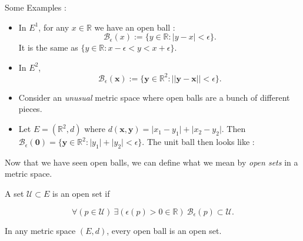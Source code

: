 Some Examples : 
\begin{itemize}
    \item In $E^1$, for any $x \in \mathbb{R}$ we have an open ball :
	\begin{displaymath}
	    \mathcal{B}_{\epsilon}(x) := \left.\lbrace y \in \mathbb{R}  : \lvert y - x \rvert 
		< \epsilon \rbrace\right. .
	\end{displaymath}
	It is the same as $\left.\lbrace y \in \mathbb{R} : x -\epsilon < y < x + \epsilon 
	    \rbrace\right.$. 
    \item In $E^2$,	
	\begin{displaymath}
	    \mathcal{B}_{\epsilon}(\mathbf{x}) := \left.\lbrace \mathbf{y} \in \mathbb{R}^2  : 
		\lvert\lvert \mathbf{y} - \mathbf{x} \rvert\rvert 
		< \epsilon \rbrace\right. .
	\end{displaymath}

	
    \item Consider an \emph{unusual} metric space where
	open balls are a bunch of different pieces.
	
    \item Let $E = (\mathbb{R}^2,d)$ where $d(\mathbf{x},\mathbf{y}) = \lvert x_1 - y_1 \rvert + 
	\lvert x_2 - y_2 \rvert$. Then $\mathcal{B}_{\epsilon}(\mathbf{0}) = \left.\lbrace
	    \mathbf{y} \in \mathbb{R}^2 : \lvert y_1 \rvert + \lvert y_2 \rvert < \epsilon 
	    \rbrace \right. $. The unit ball then looks like :

	


\end{itemize}
Now that we have seen open balls, we can define what we mean by \emph{open sets} in a metric space.
\begin{Definition}
    A set $\mathcal{U} \subset E$ is an open set if 

    \begin{displaymath}
	\forall \left(p \in \mathcal{U}\right) \ \exists\left(\epsilon(p)  > 0 \in \mathbb{R}\right) \
       	\mathcal{B}_{\epsilon}(p) \subset \mathcal{U}.    \end{displaymath}
\end{Definition}
\begin{Theorem}[name=Open ball is an open set]\label{th:op_ballset}
    In any metric space $(E,d)$, every open ball is an open set.
\end{Theorem}
